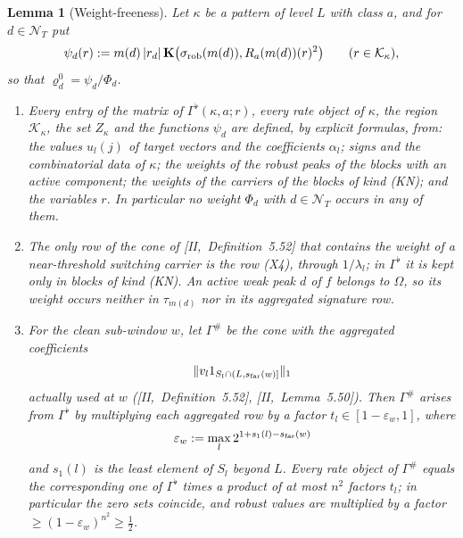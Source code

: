 \documentclass[10pt]{amsart}
\newtheorem{lemma}[theorem]{Lemma}
\theoremstyle{definition}
\theoremstyle{remark}
\begin{document}
\begin{lemma}[Weight-freeness]\label{lem:III-weightfree}
Let $\kappa$ be a pattern of level $L$ with class $a$, and for $d\in\mathcal
N_T$ put
\[
 \psi_d(r):=m(d)\,|r_d|\,\mathbf K\big(\sigma_{\rm rob}(m(d)),R_a(m(d))(r)^2\big)
 \qquad(r\in\mathcal K_\kappa),
\]
so that $\varrho^0_d=\psi_d/\Phi_d$.
\begin{enumerate}
\item[(a)] Every entry of the matrix of $\Gamma^\flat(\kappa,a;r)$, every rate
object of $\kappa$, the region $\mathcal K_\kappa$, the set $Z_\kappa$ and the
functions $\psi_d$ are defined, by explicit formulas, from: the values
$u_l(j)$ of target vectors and the coefficients $\alpha_l$; signs and the
combinatorial data of $\kappa$; the weights of the robust peaks of the
blocks with an active component; the weights of the carriers of the blocks of kind (KN); and
the variables $r$.  In particular no weight $\Phi_d$ with $d\in\mathcal N_T$
occurs in any of them.
\item[(b)] The only row of the cone of [II,~Definition~5.52] that contains
the weight of a near-threshold switching carrier is the row (X4), through
$1/\lambda_l$; in $\Gamma^\flat$ it is kept only in blocks of kind (KN).  An
active weak peak $d$ of $f$ belongs to $\Omega$, so its weight occurs neither
in $\tau_{m(d)}$ nor in its aggregated signature row.
\item[(c)] For the clean sub-window $w$, let $\Gamma^\#$ be the cone with
the aggregated coefficients
\[
 \|v_l1_{S_l\cap(L,s_{\rm far}(w)]}\|_1
\]
actually used at $w$ ([II,~Definition~5.52], [II,~Lemma~5.50]).  Then
$\Gamma^\#$ arises
from $\Gamma^\flat$ by multiplying each aggregated row by a factor $t_l\in
[1-\varepsilon_w,1]$, where
\[
 \varepsilon_w:=\max_l2^{1+s_1(l)-s_{\rm far}(w)}
\]
and $s_1(l)$ is the least element of $S_l$ beyond $L$.  Every rate object of
$\Gamma^\#$ equals the corresponding one of $\Gamma^\flat$ times a product of at
most $n^2$ factors $t_l$; in particular the zero sets coincide, and robust
values are multiplied by a factor $\ge(1-\varepsilon_w)^{n^2}\ge\frac12$.
\end{enumerate}
\end{lemma}
\end{document}

